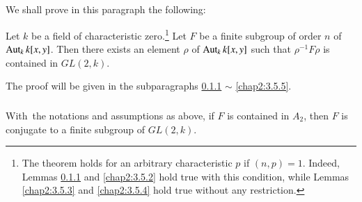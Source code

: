 \subsection{}\label{chap2:3.5}
We shall prove in this paragraph the following:

\begin{theorem*}
Let $k$ be a field of characteristic zero.\footnote{The theorem holds
  for an arbitrary characteristic $p$ if $(n,p)=1$. Indeed, Lemmas
  \ref{chap2:3.5.1} and \ref{chap2:3.5.2} hold true with this condition,
  while Lemmas \ref{chap2:3.5.3} and \ref{chap2:3.5.4} hold true without any
restriction.} Let $F$ be a
finite subgroup of order $n$ of $\operatorname{Aut}_{k}k[x,y]$. Then there exists an
element $\rho$ of $\operatorname{Aut}_{k}k[x,y]$ such that $\rho^{-1}F\rho$ is
contained in $GL(2,k)$.
\end{theorem*}

The proof will be given in the subparagraphs \ref{chap2:3.5.1} $\sim$
\ref{chap2:3.5.5}.

\subsubsection{}\label{chap2:3.5.1}
\begin{lemma*}
  With\pageoriginale\ the notations and assumptions as above, if $F$ is
  contained in $A_{2}$, then $F$ is conjugate to a finite subgroup of $GL(2,k)$.
\end{lemma*}

